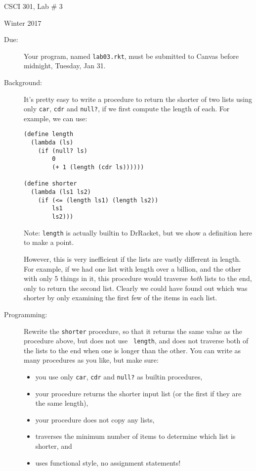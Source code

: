 \documentclass{article}
\begin{document}
\centerline{\Large CSCI 301, Lab \# 3}
\centerline{\large Winter 2017}


\begin{description}
\item[Due:] Your program, named {\tt lab03.rkt}, must be submitted to
  Canvas before midnight, Tuesday, Jan 31.

\item[Background:]  It's pretty easy to write a procedure to return
  the shorter of two lists using only {\tt car}, {\tt cdr}
  and {\tt null?}, if we first compute the length of each.  
For example, we can use:
\begin{Verbatim}[frame=single]
(define length 
  (lambda (ls) 
    (if (null? ls) 
        0 
        (+ 1 (length (cdr ls))))))

(define shorter
  (lambda (ls1 ls2)
    (if (<= (length ls1) (length ls2)) 
        ls1 
        ls2)))
\end{Verbatim}
Note: {\tt length} is actually builtin to DrRacket, but we show a
definition here to make a point.

However, this is very inefficient if the lists are vastly different in
length.  For example, if we had one list with length over a billion,
and the other with only 5 things in it, this procedure would traverse
{\em both} lists to the end, only to return the second list.  Clearly
we could have found out which was shorter by only examining the first
few of the items in each list.

\item[Programming:] Rewrite the {\tt shorter} procedure, so that it
  returns the same value as the procedure above, but does not use {\tt
    length}, and does not traverse both of the lists to the end when
  one is longer than the other.  You can write as many procedures as
  you like, but make sure:
\begin{itemize}
\item you use only {\tt car}, {\tt cdr} and {\tt null?} as builtin
  procedures,
\item your procedure
returns the shorter input list (or the first if they are the
  same length),
\item your procedure does not copy any lists,
\item traverses the minimum
  number of items to determine which list is shorter, and
\item 
  uses functional style, no assignment statements!
\end{itemize}

\end{description}
\end{document}

